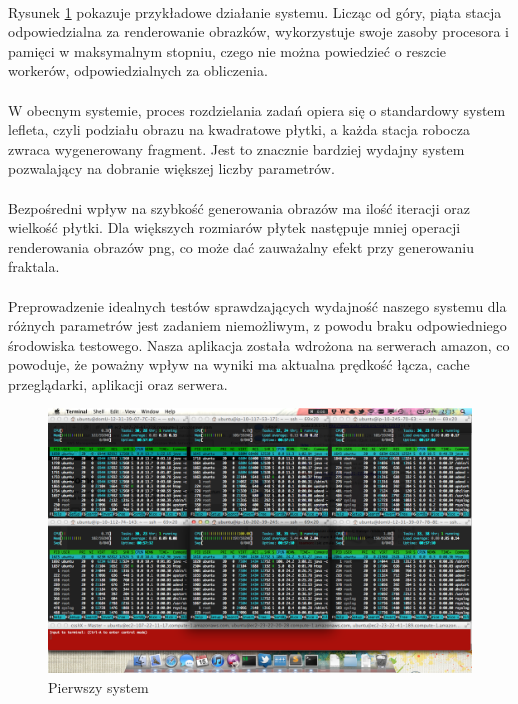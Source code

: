 \documentclass[wide,a4paper,titlepage,12pt]{article}
\begin{document}
\paragraph{}
Rysunek \ref{fig:amazon} pokazuje przykładowe działanie systemu. Licząc od góry, piąta stacja odpowiedzialna 
za renderowanie obrazków, wykorzystuje swoje zasoby procesora i pamięci w maksymalnym stopniu, czego nie można 
powiedzieć o reszcie workerów, odpowiedzialnych za obliczenia.

\paragraph{}
W obecnym systemie, proces rozdzielania zadań opiera się o standardowy system lefleta, czyli podziału obrazu na kwadratowe
płytki, a każda stacja robocza zwraca wygenerowany fragment. Jest to znacznie bardziej wydajny system pozwalający na dobranie
większej liczby parametrów.

\paragraph{}
Bezpośredni wpływ na szybkość generowania obrazów ma ilość iteracji oraz wielkość płytki. Dla większych rozmiarów płytek 
następuje mniej operacji renderowania obrazów png, co może dać zauważalny efekt przy generowaniu fraktala. 

\paragraph{}
Preprowadzenie idealnych testów sprawdzających wydajność naszego systemu dla różnych parametrów jest zadaniem niemożliwym, 
z powodu braku odpowiedniego środowiska testowego. Nasza aplikacja została wdrożona na serwerach amazon, co powoduje, 
że poważny wpływ na wyniki ma aktualna prędkość łącza, cache przeglądarki, aplikacji oraz serwera.

\begin{figure}[h!]
\begin{center}
\includegraphics[scale=0.33]{amazon.png}
\end{center}
\caption{Pierwszy system}
\label{fig:amazon}
\end{figure}
\end{document}
